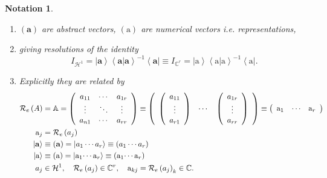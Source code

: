 \documentclass[aps,preprint]{revtex4}%
\newtheorem{notation}[theorem]{Notation}
\begin{document}
\begin{notation}
\begin{enumerate}
\item $\left(  \mathbf{a}\right)  $ are abstract vectors, $\left(
\mathrm{a}\right)  $ are numerical vectors i.e. representations,

\item giving resolutions of the identity
\begin{equation}
I_{\mathcal{H}^{1}}=\left\vert \mathbf{a}\right\rangle \left\langle \left.
\mathbf{a}\right\vert \mathbf{a}\right\rangle ^{-1}\left\langle \mathbf{a}%
\right\vert \equiv I_{\mathbb{C}^{r}}=\left\vert \mathrm{a}\right\rangle
\left\langle \left.  \mathrm{a}\right\vert \mathrm{a}\right\rangle
^{-1}\left\langle \mathrm{a}\right\vert .
\end{equation}


\item Explicitly they are related by
\begin{align}
\mathcal{R}_{e}\left(  A\right)   &  =\mathbb{A}=\left(
\begin{array}
[c]{ccc}%
a_{11} & \cdots & a_{1r}\\
\vdots & \ddots & \vdots\\
a_{n1} & \cdots & a_{rr}%
\end{array}
\right)  \equiv\left(
\begin{array}
[c]{ccc}%
\left(
\begin{array}
[c]{c}%
a_{11}\\
\vdots\\
a_{r1}%
\end{array}
\right)  & \cdots & \left(
\begin{array}
[c]{c}%
a_{1r}\\
\vdots\\
a_{rr}%
\end{array}
\right)
\end{array}
\right)  \equiv\left(
\begin{array}
[c]{ccc}%
\mathrm{a}_{1} & \mathrm{\cdots} & \mathrm{a}_{r}%
\end{array}
\right) \\
\mathrm{a}_{j}  &  =\mathcal{R}_{e}\left(  a_{j}\right) \\
\left\vert \mathbf{a}\right\rangle  &  \equiv\left(  \mathbf{a}\right)
=\left\vert a_{1}\cdots a_{r}\right\rangle \equiv\left(  a_{1}\cdots
a_{r}\right) \\
\left\vert \mathrm{a}\right\rangle  &  \equiv\left(  \mathrm{a}\right)
=\left\vert \mathrm{a}_{1}\mathrm{\cdots a}_{r}\right\rangle \equiv\left(
\mathrm{a}_{1}\mathrm{\cdots a}_{r}\right) \\
a_{j}  &  \in\mathcal{H}^{1},\quad\mathcal{R}_{e}\left(  a_{j}\right)
\in\mathbb{C}^{r},\quad\mathrm{a}_{kj}=\mathcal{R}_{e}\left(  a_{j}\right)
_{k}\in\mathbb{C}.
\end{align}



\end{enumerate}
\end{notation}
\end{document}
